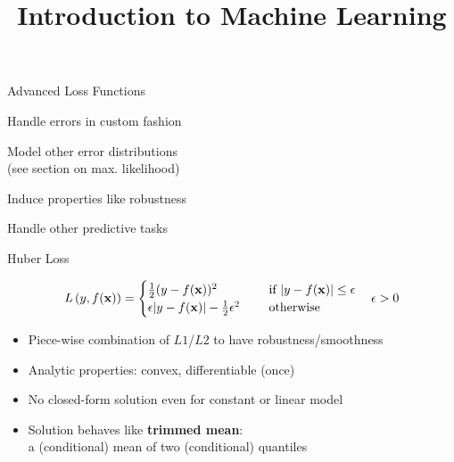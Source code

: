 \documentclass[11pt,compress,t,notes=noshow, xcolor=table]{beamer}
\title{Introduction to Machine Learning}
\begin{document}

\begin{framei}[sep=M, fs=large]{Advanced Loss Functions }

\item Handle errors in custom fashion
\item Model other error distributions\\
(see section on max. likelihood)
\item Induce properties like robustness
\item Handle other predictive tasks

\vfill



\end{framei}

\begin{frame}{Huber Loss}

$$
L\left(y, f(\mathbf{x})\right) = \begin{cases}
\frac{1}{2}(y - f(\mathbf{x}))^2  & \text{ if } |y - f(\mathbf{x})| \le \epsilon \\
\epsilon |y - f(\mathbf{x})|-\frac{1}{2}\epsilon^2 \quad & \text{ otherwise }
\end{cases} \quad \epsilon > 0
$$

\begin{itemize}
\item Piece-wise combination of $L1$/$L2$ to have robustness/smoothness
\item Analytic properties: convex, differentiable (once)
\end{itemize}




\begin{itemize}
\item No closed-form solution even for constant or linear model
\item Solution behaves like \textbf{trimmed mean}:\\
a (conditional) mean of two (conditional) quantiles  
\end{itemize}

\end{frame}
\end{document}

